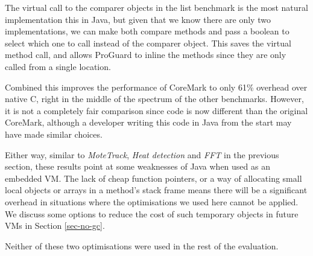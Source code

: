 The virtual call to the comparer objects in the list benchmark is the most natural implementation this in Java, but given that we know there are only two implementations, we can make both compare methods  and pass a boolean to select which one to call instead of the comparer object. This saves the virtual method call, and allows ProGuard to inline the methods since they are only called from a single location.

Combined this improves the performance of CoreMark to only 61\% overhead over native C, right in the middle of the spectrum of the other benchmarks. However, it is not a completely fair comparison since code is now different than the original CoreMark, although a developer writing this code in Java from the start may have made similar choices.

Either way, similar to \emph{MoteTrack}, \emph{Heat detection} and \emph{FFT} in the previous section, these results point at some weaknesses of Java when used as an embedded VM. The lack of cheap function pointers, or a way of allocating small local objects or arrays in a method's stack frame means there will be a significant overhead in situations where the optimisations we used here cannot be applied. We discuss some options to reduce the cost of such temporary objects in future VMs in Section \ref{sec-no-gc}.

Neither of these two optimisations were used in the rest of the evaluation.


















